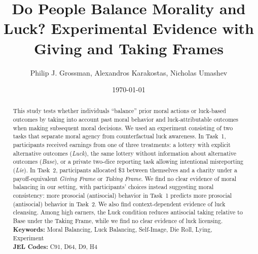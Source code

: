 \documentclass{article}
\begin{document}
\begin{titlepage}
    \title{Do People Balance Morality and Luck? Experimental Evidence with Giving and Taking Frames}
    \author{Philip J. Grossman, Alexandros Karakostas, Nicholas Umashev} %
    \date{\today}
    \maketitle
    \begin{abstract}
        \noindent  
        This study tests whether individuals ``balance'' prior moral actions or luck-based outcomes by taking into account past moral behavior and luck-attributable outcomes when making subsequent moral decisions. We used an experiment consisting of two tasks that separate moral agency from counterfactual luck awareness. In Task~1, participants received earnings from one of three treatments: a lottery with explicit alternative outcomes (\textit{Luck}), the same lottery without information about alternative outcomes (\textit{Base}), or a private two-dice reporting task allowing intentional misreporting (\textit{Lie}). In Task~2, participants allocated \$3 between themselves and a charity under a payoff-equivalent \textit{Giving Frame} or \textit{Taking Frame}. We find no clear evidence of moral balancing in our setting, with participants' choices instead suggesting moral consistency: more prosocial (antisocial) behavior in Task~1 predicts more prosocial (antisocial) behavior in Task~2. We also find context-dependent evidence of luck cleansing. Among high earners, the Luck condition reduces antisocial taking relative to Base under the Taking Frame, while we find no clear evidence of luck licensing.
        \vspace{6mm} 
        \\ 
        \noindent\textbf{Keywords:} Moral Balancing, Luck Balancing, Self-Image, Die Roll, Lying, Experiment \\
        \noindent\textbf{JEL Codes:} C91, D64, D9, H4\\
    \bigskip
    \end{abstract}
    \setcounter{page}{0}
    \thispagestyle{empty}
    \begingroup
    \renewcommand\thefootnote{}%
    \endgroup
\end{titlepage}

\newpage
\end{document}
